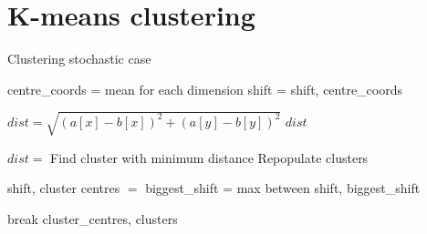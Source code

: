 \section{K-means clustering}
\begin{algorithm}
\label{alg:KMeans}
\caption{Clustering stochastic case}
 \begin{algorithmic}[1]
    \Statex
    
    
    	\Statex
    		\State centre\_coords =  mean for each dimension
    		\State shift = 
    		\State \Return shift, centre\_coords
    	\EndFunction
    
    	\Statex
    		\State $dist = \sqrt{(a[x] - b[x])^2+(a[y] - b[y])^2}$
    		\State \Return $dist$
    	\EndFunction
      
      	\Statex
      				\State $dist = $
      			\EndFor
      			\State Find cluster with minimum distance
      			\State Repopulate clusters
      		\EndFor
      		
      			\State shift, cluster centres $=$ 
      			\State biggest\_shift =  max between shift, biggest\_shift
      			
      		\EndFor
      			\State break
      		\EndIf
      	\EndWhile
      \State \Return cluster\_centres, clusters
    \EndFunction

  \end{algorithmic}
\end{algorithm}
